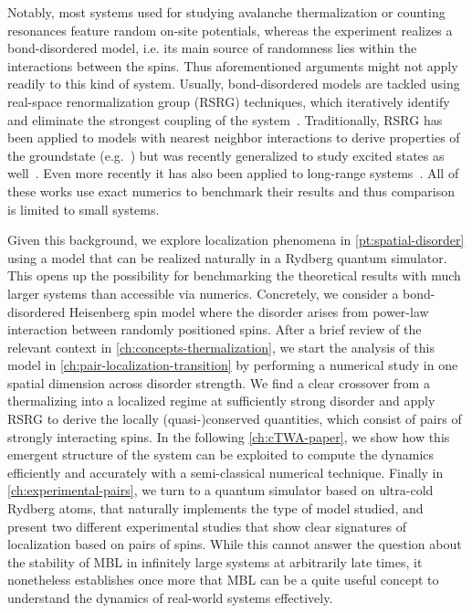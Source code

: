 Notably, most systems used for studying avalanche thermalization or counting resonances feature random on-site potentials, whereas the experiment realizes a bond-disordered model, i.e. its main source of randomness lies within the interactions between the spins. Thus aforementioned arguments might not apply readily to this kind of system. Usually, bond-disordered models are tackled using real-space renormalization group (RSRG) techniques, which iteratively identify and eliminate the strongest coupling of the system~\cite{igloiStrongDisorderRG2005,parameswaranEigenstatePhaseTransitions2017,igloiStrongDisorderRG2018,monthusStrongDisorderRenormalization2018}. Traditionally, RSRG has been applied to models with nearest neighbor interactions to derive properties of the groundstate (e.g.~\cite{dasguptaLowtemperaturePropertiesRandom1980,fisherRandomTransverseField1992,voskManybodyLocalizationOne2013}) but was recently generalized to study excited states as well~\cite{pekkerHilbertGlassTransitionNew2014}. Even more recently it has also been applied to long-range systems~\cite{moureManyBodyLocalizationTransition2015,moureDisorderedQuantumSpin2018,mohdebEntanglementPropertiesDisordered2020,mohdebExcitedEigenstateEntanglementProperties2022,mohdebGlobalQuenchDynamics2023}. All of these works use exact numerics to benchmark their results and thus comparison is limited to small systems.

Given this background, we explore localization phenomena in \autoref{pt:spatial-disorder} using a model that can be realized naturally in a Rydberg quantum simulator.  This opens up the possibility for benchmarking the theoretical results with much larger systems than accessible via numerics. Concretely, we consider a bond-disordered Heisenberg spin model where the disorder arises from power-law interaction between randomly positioned spins. 
After a brief review of the relevant context in \autoref{ch:concepts-thermalization}, we start the analysis of this model in \autoref{ch:pair-localization-transition} by performing a numerical study in one spatial dimension across disorder strength. We find a clear crossover from a thermalizing into a localized regime at sufficiently strong disorder and apply RSRG to derive the locally (quasi-)conserved quantities, which consist of pairs of strongly interacting spins. In the following \autoref{ch:cTWA-paper}, we show how this emergent structure of the system can be exploited to compute the dynamics efficiently and accurately with a semi-classical numerical technique. Finally in \autoref{ch:experimental-pairs}, we turn to a quantum simulator based on ultra-cold Rydberg atoms, that naturally implements the type of model studied, and present two different experimental studies that show clear signatures of localization based on pairs of spins. 
While this cannot answer the question about the stability of MBL in infinitely large systems at arbitrarily late times, it nonetheless establishes once more that MBL can be a quite useful concept to understand the dynamics of real-world systems effectively.

